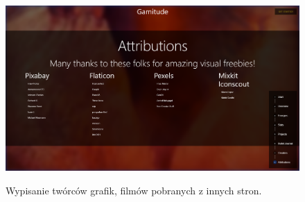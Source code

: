 \documentclass[a4paper,11pt]{report}
\begin{document}
\begin{figure}[H]
	\centering
	\includegraphics[scale=0.3]{prezentacja/Homepage_Attributions}\\
	\caption{Wypisanie twórców grafik, filmów pobranych z innych stron.}
	\label{fig:homepage_attributions}
\end{figure}
\end{document}
